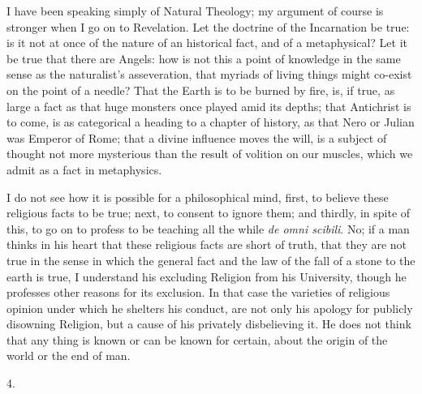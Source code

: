 I have been speaking simply of Natural Theology; my argument of
course is stronger when I go on to Revelation. Let the doctrine of the
Incarnation be true: is it not at once of the nature of an historical
fact, and of a metaphysical? Let it be true that there are Angels: how
is not this a point of knowledge in the same sense as the naturalist's
asseveration, that myriads of living things might co-exist on the
point of a needle? That the Earth is to be burned by fire, is, if
true, as large a fact as that huge monsters once played amid its
depths; that Antichrist is to come, is as categorical a heading to a
chapter of history, as that Nero or Julian was Emperor of Rome; that a
divine influence moves the will, is a subject of thought not more
mysterious than the result of volition on our muscles, which we admit
as a fact in metaphysics.

I do not see how it is possible for a philosophical mind, first, to
believe these religious facts to be true; next, to consent to ignore
them; and thirdly, in spite of this, to go on to profess to be
teaching all the while \emph{de omni scibili}. No; if a man thinks in
his heart that these religious facts are short of truth, that they are
not true in the sense in which the general fact and the law of the
fall of a stone to the earth is true, I understand his excluding
Religion from his University, though he professes other reasons for
its exclusion. In that case the varieties of religious opinion under
which he shelters his conduct, are not only his apology for publicly
disowning Religion, but a cause of his privately disbelieving it. He
does not think that any thing is known or can be known for certain,
about the origin of the world or the end of man.

4.


